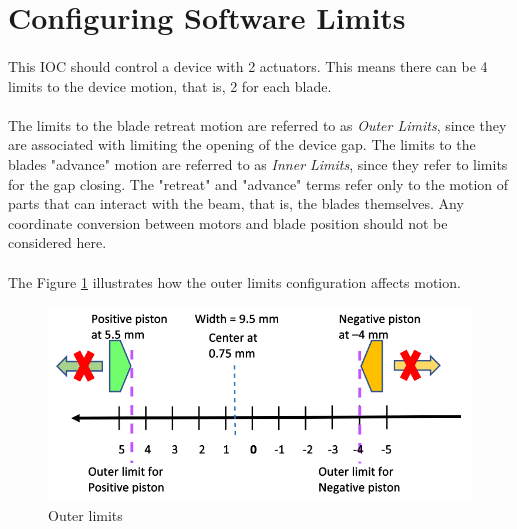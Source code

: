 \documentclass[openany]{article}
\begin{document}
    \bigskip
    \noindent{}

\section{Configuring Software Limits}

    \paragraph{} This IOC should control a device with 2 actuators. This means there can be 4 limits to the device motion, that is, 2 for each blade.

    \paragraph{} The limits to the blade retreat motion are referred to as \emph{Outer Limits}, since they are associated with limiting the opening of the device gap. The limits to the blades "advance" motion are referred to as \emph{Inner Limits}, since they refer to limits for the gap closing. The "retreat" and "advance" terms refer only to the motion of parts that can interact with the beam, that is, the blades themselves. Any coordinate conversion between motors and blade position should not be considered here.

    \paragraph{} The Figure \ref{fig:outer-limits} illustrates how the outer limits configuration affects motion.

    \begin{figure}[!h]
        \caption{Outer limits}
        \label{fig:outer-limits}
        \centering
        \includegraphics[width=1.0\textwidth]{diff_ctrl_outer_limits}
    \end{figure}
    \FloatBarrier
\end{document}

